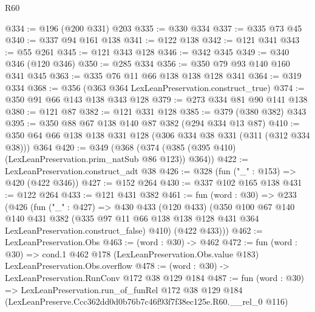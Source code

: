 \begin{lexlean}{R60}
\begin{coremodule}
@334 := @196 (@200 @331) @203
@335 := @330 @334
@337 := @335 @73 @45
@340 := @337 @94 @161 @138
@341 := @122 @138
@342 := @121 @341
@343 := @55 @261
@345 := @121 @343 @128
@346 := @342 @345
@349 := @340 @346 (@120 @346)
@350 := @285 @334
@356 := @350 @79 @93 @140 @160 @341 @345
@363 := @335 @76 @11 @66 @138 @138 @128 @341
@364 := @319 @334
@368 := @356 (@363 @364 LexLeanPreservation.construct_true)
@374 := @350 @91 @66 @143 @138 @343 @128
@379 := @273 @334 @81 @90 @141 @138
@380 := @121 @87
@382 := @121 @331 @128
@385 := @379 (@380 @382) @343
@395 := @350 @88 @67 @138 @140 @87 @382 (@294 @334 @13 @87)
@410 := @350 @64 @66 @138 @138 @331 @128 (@306 @334 @38 @331 (@311 (@312 @334 @38))) @364
@420 := @349 (@368 (@374 (@385 (@395 @410) (LexLeanPreservation.prim_natSub @86 @123)) @364))
@422 := LexLeanPreservation.construct_adt @38
@426 := @328 (fun ("_" : @153) => @420 (@422 @346))
@427 := @152 @264
@430 := @337 @102 @165 @138
@431 := @122 @264
@433 := @121 @431 @382
@461 := fun (word : @30) =>
  @233
    (@426
      (fun ("_" : @427) =>
      @430
        @433
        (@120 @433)
        (@350
          @100
          @67
          @140
          @140
          @431
          @382
          (@335 @97 @11 @66 @138 @138 @128 @431 @364 LexLeanPreservation.construct_false)
          @410)
        (@422 @433)))
@462 := LexLeanPreservation.Obs
@463 := (word : @30) -> @462
@472 := fun (word : @30) =>
  cond.{1} @462 @178 (LexLeanPreservation.Obs.value @183) LexLeanPreservation.Obs.overflow
@478 := (word : @30) -> LexLeanPreservation.RunConv @172 @38 @129 @184
@487 := fun (word : @30) =>
  LexLeanPreservation.run_of_funRel
    @172
    @38
    @129
    @184
    (LexLeanPreserve.Ccc362dd0d0b76b7c46f93f7f38ec125e.R60.__rel_0 @116)
\end{coremodule}
\end{lexlean}
